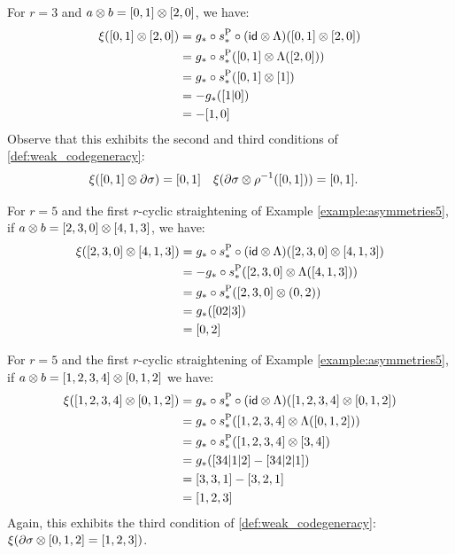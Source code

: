 \begin{example}\label{example:f3_2}
	For $r=3$ and $a \otimes b = [0,1] \otimes [2,0]$, we have:
	\begin{align*}
		\xi([0,1] \otimes [2,0]) &= g_*\circ s_*^{{\operatorname{P}}}\circ (\mathsf{id}\otimes \Lambda)([0,1] \otimes [2,0])
		\\
		&= g_*\circ s_*^{{\operatorname{P}}}([0,1] \otimes \Lambda([2,0]))
		\\
		&= g_*\circ s_*^{{\operatorname{P}}} ([0,1] \otimes [1])
		\\
		&= -g_*([1|0])
		\\
		&= -[1,0]
	\end{align*}
	Observe that this exhibits the second and third conditions of \cref{def:weak_codegeneracy}:
	\begin{align*}
		\xi ([0,1] \otimes \partial\sigma) &= [0,1]
		&
		\xi(\partial\sigma \otimes \rho^{-1}([0,1])) &= [0,1].
	\end{align*}
\end{example}

\begin{example}\label{example:f5_1}
	For $r=5$ and the first $r$-cyclic straightening of Example \ref{example:asymmetries5}, if $a \otimes b = [2,3,0] \otimes [4,1,3]$, we have:
	\begin{align*}
		\xi([2,3,0] \otimes [4,1,3]) &= g_*\circ s_*^{{\operatorname{P}}}\circ (\mathsf{id}\otimes \Lambda)([2,3,0] \otimes [4,1,3])
		\\
		&= -g_*\circ s_*^{{\operatorname{P}}}([2,3,0] \otimes \Lambda([4,1,3]))
		\\
		&= g_*\circ s_*^{{\operatorname{P}}}([2,3,0] \otimes (0,2))
		\\
		&= g_*([02|3])
		\\
		&= [0,2]
	\end{align*}
\end{example}

\begin{example}\label{example:f5_2}
	For $r=5$ and the first $r$-cyclic straightening of Example \ref{example:asymmetries5}, if $a \otimes b = [1,2,3,4] \otimes [0,1,2]$ we have:
	\begin{align*}
		\xi([1,2,3,4] \otimes [0,1,2])
		&= g_*\circ s_*^{{\operatorname{P}}}\circ (\mathsf{id}\otimes \Lambda)([1,2,3,4] \otimes [0,1,2])
		\\
		&= g_*\circ s_*^{{\operatorname{P}}}([1,2,3,4] \otimes \Lambda([0,1,2]))
		\\
		&= g_*\circ s_*^{{\operatorname{P}}}([1,2,3,4] \otimes [3,4])
		\\
		&= g_*([34|1|2]-[34|2|1])
		\\
		&= [3,3,1] - [3,2,1]
		\\
		&= [1,2,3]
	\end{align*}
	Again, this exhibits the third condition of \cref{def:weak_codegeneracy}: $\xi(\partial\sigma \otimes [0,1,2] = [1,2,3])$.
\end{example}


